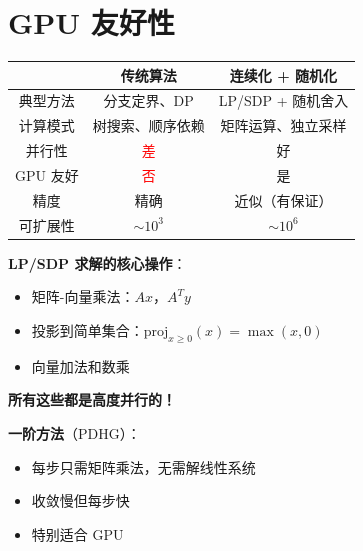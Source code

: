 \documentclass[12pt, a4paper]{ctexart}
\begin{document}
\section{GPU 友好性}

\begin{blackboard}[传统 vs 现代方法]

\begin{center}
\begin{tabular}{c|c|c}
& \textbf{传统算法} & \textbf{连续化 + 随机化} \\
\hline
典型方法 & 分支定界、DP & LP/SDP + 随机舍入 \\
\hline
计算模式 & 树搜索、顺序依赖 & 矩阵运算、独立采样 \\
\hline
并行性 & \textcolor{red}{差} & \textcolor{green!50!black}{好} \\
\hline
GPU 友好 & \textcolor{red}{否} & \textcolor{green!50!black}{是} \\
\hline
精度 & 精确 & 近似（有保证） \\
\hline
可扩展性 & $\sim 10^3$ & $\sim 10^6$
\end{tabular}
\end{center}

\end{blackboard}

\begin{gpubox}

\textbf{LP/SDP 求解的核心操作}：

\begin{itemize}
    \item 矩阵-向量乘法：$Ax$，$A^T y$
    \item 投影到简单集合：$\text{proj}_{x \geq 0}(x) = \max(x, 0)$
    \item 向量加法和数乘
\end{itemize}

\textbf{所有这些都是高度并行的！}

\textbf{一阶方法}（PDHG）：
\begin{itemize}
    \item 每步只需矩阵乘法，无需解线性系统
    \item 收敛慢但每步快
    \item 特别适合 GPU
\end{itemize}

\end{gpubox}
\end{document}
